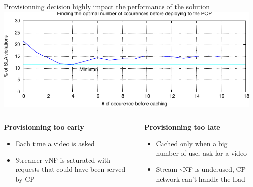 \documentclass[a4paper]{beamer}
\begin{document}
\begin{frame}{Provisionning decision highly impact the performance of the solution}
	\includegraphics[width=0.90\linewidth]{cachingStrat_evaluation.pdf}
		\begin{columns}[T]
		\begin{column}[T]{0.5 \textwidth} 
		
		\textbf{Provisionning too early}
			\begin{itemize}
				\item Each time a video is asked
				\item Streamer vNF is saturated with requests that could have been served by CP
			\end{itemize}
		\end{column}
										
		\begin{column}[T]{0.5\textwidth} 
										  
			\textbf{Provisionning too late}
			\begin{itemize}
				\item Cached only when a big number of user ask for a video
				\item Stream vNF is underused, CP network can't handle the load
			\end{itemize}
			
		\end{column}
																										
	\end{columns}
\end{frame}
\end{document}
